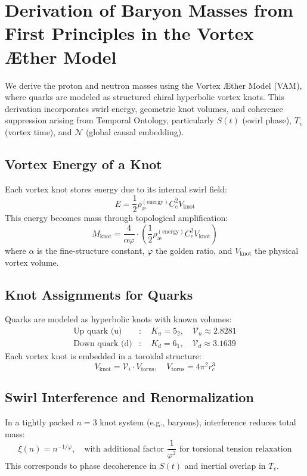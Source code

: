 
\section{Derivation of Baryon Masses from First Principles in the Vortex \AE{}ther Model}

We derive the proton and neutron masses using the Vortex \AE{}ther Model (VAM), where quarks are modeled as structured chiral hyperbolic vortex knots. This derivation incorporates swirl energy, geometric knot volumes, and coherence suppression arising from Temporal Ontology, particularly $S(t)$ (swirl phase), $T_v$ (vortex time), and $\mathcal{N}$ (global causal embedding).

\subsection{Vortex Energy of a Knot}
Each vortex knot stores energy due to its internal swirl field:
\[
E = \frac{1}{2} \rho_\text{\ae}^{(\text{energy})} C_e^2 V_{\text{knot}}
\]
This energy becomes mass through topological amplification:
\[
\boxed{
M_{\text{knot}} = \frac{4}{\alpha \varphi} \cdot \left( \frac{1}{2} \rho_\text{\ae}^{(\text{energy})} C_e^2 V_{\text{knot}} \right)
}
\]
where $\alpha$ is the fine-structure constant, $\varphi$ the golden ratio, and $V_{\text{knot}}$ the physical vortex volume.

\subsection{Knot Assignments for Quarks}
Quarks are modeled as hyperbolic knots with known volumes:
\[
\begin{aligned}
\text{Up quark (u)} &: \quad K_u = 5_2, \quad \mathcal{V}_u \approx 2.8281 \\
\text{Down quark (d)} &: \quad K_d = 6_1, \quad \mathcal{V}_d \approx 3.1639
\end{aligned}
\]
Each vortex knot is embedded in a toroidal structure:
\[
V_{\text{knot}} = \mathcal{V}_i \cdot V_{\text{torus}}, \quad V_{\text{torus}} = 4\pi^2 r_c^3
\]

\subsection{Swirl Interference and Renormalization}
In a tightly packed $n=3$ knot system (e.g., baryons), interference reduces total mass:
\[
\xi(n) = n^{-1/\varphi}, \quad \text{with additional factor } \frac{1}{\varphi^2} \text{ for torsional tension relaxation}
\]
This corresponds to phase decoherence in $S(t)$ and inertial overlap in $T_v$.


